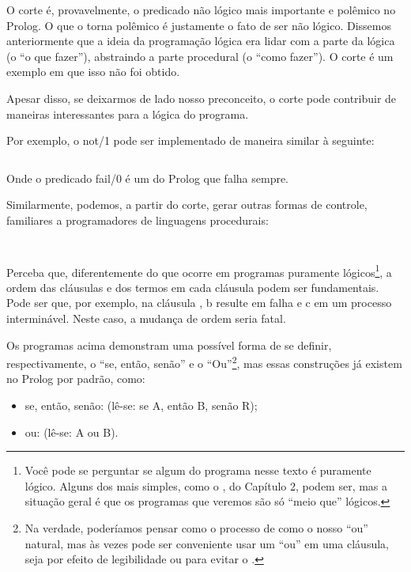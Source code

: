 \documentclass{article}
\begin{document}
O corte é, provavelmente, o predicado não lógico mais importante e polêmico no Prolog. O que o torna polêmico é justamente o fato de ser não lógico. Dissemos anteriormente que a ideia da programação lógica era lidar com a parte da lógica (o ``o que fazer''), abstraindo a parte procedural (o ``como fazer''). O corte é um exemplo em que isso não foi obtido.

Apesar disso, se deixarmos de lado nosso preconceito, o corte pode contribuir de maneiras interessantes para a lógica do programa.

Por exemplo, o not/1 pode ser implementado de maneira similar à seguinte:

\inputminted{prolog}{../Exemplos/Cap4/prog3_not.pl}

Onde o predicado fail/0 é um  do Prolog que falha sempre.

Similarmente, podemos, a partir do corte, gerar outras formas de controle, familiares a programadores de linguagens procedurais:

\inputminted{prolog}{../Exemplos/Cap4/prog4_ifthenelse.pl}

\inputminted{prolog}{../Exemplos/Cap4/prog5_or.pl}

Perceba que, diferentemente do que ocorre em programas puramente lógicos\footnote{Você pode se perguntar se algum do programa nesse texto é puramente lógico. Alguns dos mais simples, como o , do Capítulo 2, %
podem ser, mas a situação geral é que os programas que veremos são só ``meio que'' lógicos.}, a ordem das cláusulas e dos termos em cada cláusula podem ser fundamentais. Pode ser que, por exemplo, na cláusula , b resulte em falha e c em um
processo interminável. Neste caso, a mudança de ordem seria fatal.

Os programas acima demonstram uma possível forma de se definir, respectivamente, o ``se, então, senão'' e o ``Ou''\footnote{Na verdade, poderíamos pensar como o processo de  como o nosso ``ou'' natural, mas às vezes pode ser conveniente usar um ``ou'' em uma cláusula, seja por efeito de legibilidade ou para evitar o .}, mas essas construções já existem no Prolog por padrão, como:

\begin{itemize}
  \item se, então, senão:  (lê-se: se A, então B, senão R);
  \item ou:  (lê-se: A ou B).
\end{itemize}




\end{document}
